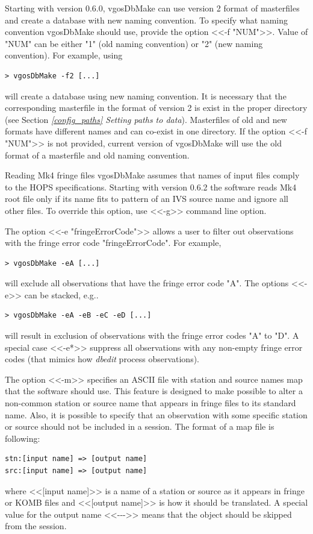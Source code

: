 \documentclass [10pt,letterpaper]{report}
\begin{document}
Starting with version 0.6.0, vgosDbMake can use version 2 format of masterfiles and create a database
with new naming convention. To specify what naming convention vgosDbMake should use, provide the 
option <<-f "NUM">>. Value of "NUM" can be either "1" (old naming convention) or "2" (new naming 
convention). For example, using
\begin{verbatim}
> vgosDbMake -f2 [...]
\end{verbatim}
will create a database using new naming convention. It is necessary that the corresponding masterfile
in the format of version 2 is exist in the proper directory 
(see Section \emph{\ref{config_paths} Setting paths to data}).
Masterfiles of old and new formats have different names and can co-exist in one directory.
If the option  <<-f "NUM">> is not provided, current version of vgosDbMake will use the
old format of a masterfile and old naming convention.

Reading Mk4 fringe files vgosDbMake assumes that names of input files comply to the HOPS
specifications. Starting with version 0.6.2 the software reads Mk4 root file only if its
name fits to pattern of an IVS source name and ignore all other files. To override this
option, use <<-g>> command line option.

The option <<-e "fringeErrorCode">> allows a user to filter out observations with the fringe error
code "fringeErrorCode". For example,
\begin{verbatim}
> vgosDbMake -eA [...]
\end{verbatim}
will exclude all observations that have the fringe error code "A". The options
<<-e>> can be stacked, e.g..
\begin{verbatim}
> vgosDbMake -eA -eB -eC -eD [...]
\end{verbatim}
will result in exclusion of observations with the fringe error codes "A" to "D".
A special case <<-e*>> suppress all observations with any non-empty fringe error
codes (that mimics how {\it dbedit} process observations).


The option <<-m>> specifies an ASCII file with station and source names map
that the software should use. This feature is designed to make possible to
alter a non-common station or source name that appears in fringe files to
its standard name. Also, it is possible to specify that an observation with
some specific station or source should not be included in a session. The format
of a map file is following:
\begin{verbatim}
stn:[input name] => [output name]
src:[input name] => [output name]
\end{verbatim}
\noindent
where <<[input name]>> is a name of a station or source as it appears in fringe
or KOMB files and <<[output name]>> is how it should be translated. A special value
for the output name <<-{}-{}->> means that the object should be skipped from the session.
\end{document}
